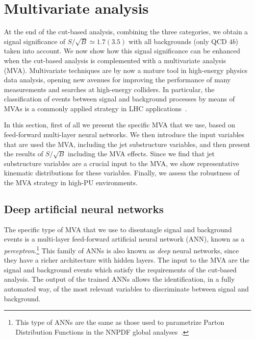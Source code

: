 
\section{Multivariate analysis}
\label{sec:mva}

At the end of the cut-based analysis,
combining the three categories,
we obtain a signal significance of $S/\sqrt{B}\simeq 1.7 (3.5)$
with all backgrounds (only QCD $4b$) taken into account.
%
We now show how this signal significance
 can be enhanced when the cut-based analysis
 is complemented with a multivariate analysis (MVA).
%
 Multivariate techniques are by now a mature tool
 in high-energy physics data analysis, opening
 new avenues for improving the performance
of many measurements and searches at high-energy colliders.
%
In particular, the classification of events between signal and
background processes by means of MVAs is a
commonly applied strategy in LHC
applications~\cite{Baldi:2014pta,Aaltonen:2012qt,
  Wardrope:2014kya,Chatrchyan:2013zna,Dall'Osso:2015aia}.

In this section, first of all we present the specific MVA that we use,
based on feed-forward multi-layer neural networks.
%
We then introduce the input variables that are
used the MVA, including the jet substructure
variables, and then present the results of $S/\sqrt{B}$ including
the MVA effects.
%
Since we find that jet substructure variables are a crucial input
to the MVA, we show representative kinematic distributions
for these variables.
%
Finally, we assess the robustness of the MVA strategy in
high-PU environments.

\subsection{Deep artificial neural networks}

%
The specific type of  MVA that we use to
disentangle signal and background events is
a multi-layer feed-forward artificial neural network (ANN),
known as a {\it perceptron}.\footnote{This type of ANNs are the same
  as those used to parametrize Parton Distribution Functions
in the NNPDF global analyses~\cite{DelDebbio:2004qj,Ball:2008by,Ball:2011mu,Ball:2010de}.}
%
This family of ANNs is also known as {\it deep} neural networks, since they have
a richer architecture with hidden layers.
%
The input to the MVA are the
signal and background
events which satisfy the requirements of the
cut-based analysis.
%
The output of the trained ANNs allows the identification, in a fully automated way,
of the most relevant variables to discriminate between 
signal and background.

